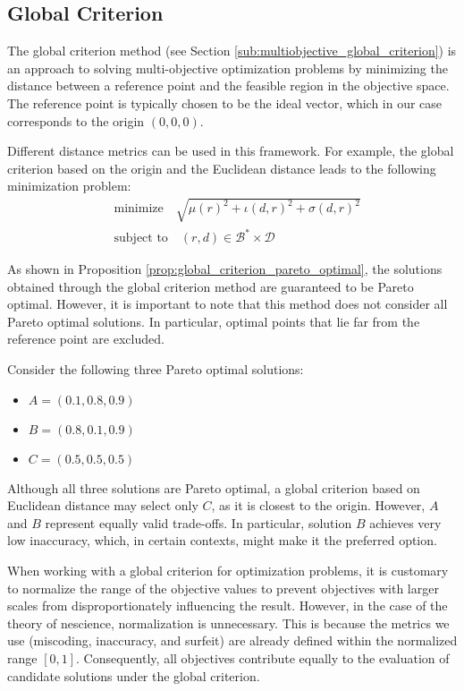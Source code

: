 
\subsection{Global Criterion}

The global criterion method (see Section \ref{sub:multiobjective_global_criterion}) is an approach to solving multi-objective optimization problems by minimizing the distance between a reference point and the feasible region in the objective space. The reference point is typically chosen to be the ideal vector, which in our case corresponds to the origin $(0, 0, 0)$.

Different distance metrics can be used in this framework. For example, the global criterion based on the origin and the Euclidean distance leads to the following minimization problem:
\begin{align*}
& \text{minimize} \quad \sqrt{ \mu(r)^2 + \iota(d, r)^2 + \sigma(d, r)^2 } \\
& \text{subject to} \quad (r, d) \in \mathcal{B}^\ast \times \mathcal{D}
\end{align*}

As shown in Proposition \ref{prop:global_criterion_pareto_optimal}, the solutions obtained through the global criterion method are guaranteed to be Pareto optimal. However, it is important to note that this method does not consider all Pareto optimal solutions. In particular, optimal points that lie far from the reference point are excluded.

\begin{example}
Consider the following three Pareto optimal solutions:

\begin{itemize}
\item $A=(0.1,0.8,0.9)$
\item $B=(0.8,0.1,0.9)$
\item $C=(0.5,0.5,0.5)$
\end{itemize}

Although all three solutions are Pareto optimal, a global criterion based on Euclidean distance may select only $C$, as it is closest to the origin. However, $A$ and $B$ represent equally valid trade-offs. In particular, solution $B$ achieves very low inaccuracy, which, in certain contexts, might make it the preferred option.
\end{example}

When working with a global criterion for optimization problems, it is customary to normalize the range of the objective values to prevent objectives with larger scales from disproportionately influencing the result. However, in the case of the theory of nescience, normalization is unnecessary. This is because the metrics we use (miscoding, inaccuracy, and surfeit) are already defined within the normalized range $[0, 1]$. Consequently, all objectives contribute equally to the evaluation of candidate solutions under the global criterion.

